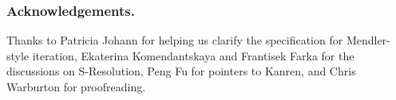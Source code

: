 \documentclass[runningheads,a4paper]{llncs}
\begin{document}
% 
% 
% 
% 

\subsubsection*{Acknowledgements.}
Thanks to Patricia Johann for helping us clarify the specification
for Mendler-style iteration, Ekaterina Komendantskaya and
Frantisek Farka for the discussions on S-Resolution,
Peng Fu for pointers to Kanren, and Chris Warburton for proofreading.
\makeatletter
\renewcommand\bibsection{\section*\bibname}
\makeatother



\end{document}
